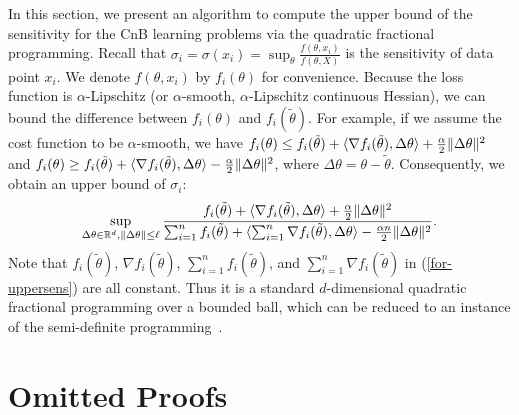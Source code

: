 In this section, we present an algorithm to compute the upper bound of the sensitivity for the CnB learning problems via the quadratic fractional programming. 
Recall that $ \sigma_i=\sigma(x_i)=\sup_\theta\frac{f(\theta,x_i)}{f(\theta,X)} $ is the sensitivity of data point $ x_i $. We denote $ f(\theta,x_i) $ by $ f_i(\theta) $ for convenience. Because the loss function is $\alpha$-Lipschitz (or $\alpha$-smooth, $ \alpha $-Lipschitz continuous Hessian), we can bound the difference between $f_i(\theta) $ and $f_i(\tilde{\theta})$. For example, if we assume the cost function to be $ \alpha $-smooth, 
 we have $ f_i(\theta) \leq f_i(\tilde{\theta})+\braket{\nabla f_i(\tilde{\theta}),\Delta \theta}+\frac{\alpha}{2}\|\Delta\theta\|^2 $ and $ f_i(\theta) \geq f_i(\tilde{\theta})+\braket{\nabla f_i(\tilde{\theta}),\Delta \theta}-\frac{\alpha}{2}\|\Delta\theta\|^2 $, where $\Delta \theta=\theta-\tilde{\theta}$. Consequently, we obtain an upper bound of $ \sigma_i $: 
 \begin{eqnarray}
 \sup_{\Delta\theta\in\mathbb{R}^d,\|\Delta\theta\|\leq\ell} \frac{f_i(\tilde{\theta})+\braket{\nabla f_i(\tilde{\theta}),\Delta \theta}+\frac{\alpha}{2}\|\Delta\theta\|^2}{\sum_{i=1}^n f_i(\tilde{\theta})+\braket{\sum_{i=1}^n\nabla f_i(\tilde{\theta}),\Delta \theta}-\frac{\alpha n}{2}\|\Delta\theta\|^2}.\label{for-uppersens}
 \end{eqnarray}
 Note that $f_i(\tilde{\theta})$, $\nabla f_i(\tilde{\theta})$, $\sum_{i=1}^n f_i(\tilde{\theta})$, and $\sum_{i=1}^n\nabla f_i(\tilde{\theta})$ in (\ref{for-uppersens}) are all constant. 
Thus it is a standard $d$-dimensional quadratic fractional programming over a bounded ball, which can be reduced to an instance of the semi-definite programming~\cite{BeckT09}.

\section{Omitted Proofs}

